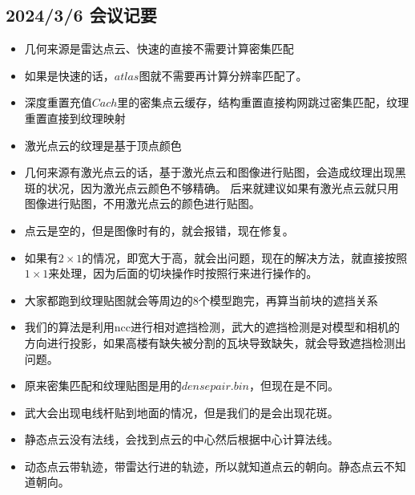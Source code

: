 \subsection{2024/3/6 会议记要}

\begin{itemize}
    \item 几何来源是雷达点云、快速的直接不需要计算密集匹配
    \item  如果是快速的话，$atlas$图就不需要再计算分辨率匹配了。
    \item 深度重置充值$Cach$里的密集点云缓存，结构重置直接构网跳过密集匹配，纹理重置直接到纹理映射
    \item 激光点云的纹理是基于顶点颜色
    \item 几何来源有激光点云的话，基于激光点云和图像进行贴图，会造成纹理出现黑斑的状况，因为激光点云颜色不够精确。
    后来就建议如果有激光点云就只用图像进行贴图，不用激光点云的颜色进行贴图。
    \item 点云是空的，但是图像时有的，就会报错，现在修复。
    \item 如果有$2 \times 1$的情况，即宽大于高，就会出问题，现在的解决方法，就直接按照$1 \times 1$来处理，因为后面的切块操作时按照行来进行操作的。
    \item 大家都跑到纹理贴图就会等周边的8个模型跑完，再算当前块的遮挡关系
    \item 我们的算法是利用ncc进行相对遮挡检测，武大的遮挡检测是对模型和相机的方向进行投影，如果高楼有缺失被分割的瓦块导致缺失，就会导致遮挡检测出问题。
    \item 原来密集匹配和纹理贴图是用的$densepair.bin$，但现在是不同。
    \item 武大会出现电线杆贴到地面的情况，但是我们的是会出现花斑。
    \item 静态点云没有法线，会找到点云的中心然后根据中心计算法线。
    \item 动态点云带轨迹，带雷达行进的轨迹，所以就知道点云的朝向。静态点云不知道朝向。
\end{itemize}